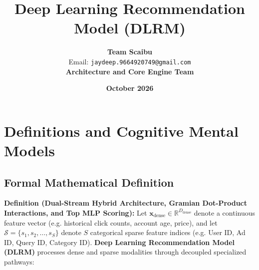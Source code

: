 \documentclass[11pt,a4paper]{article}
\title{\textbf{Deep Learning Recommendation Model (DLRM)}}
\author{\textbf{Team Scaibu} \\ \small Email: \texttt{jaydeep.9664920749@gmail.com} \\ \small \textbf{Architecture and Core Engine Team}}
\date{\textbf{October 2026}}
\theoremstyle{definition}
\begin{document}
\maketitle

\section{Definitions and Cognitive Mental Models}

\subsection{Formal Mathematical Definition}
\textbf{Definition (Dual-Stream Hybrid Architecture, Gramian Dot-Product Interactions, and Top MLP Scoring):}
Let $\mathbf{x}_{\text{dense}} \in \mathbb{R}^{D_{\text{dense}}}$ denote a continuous feature vector (e.g. historical click counts, account age, price), and let $\mathcal{S} = \{s_1, s_2, \dots, s_S\}$ denote $S$ categorical sparse feature indices (e.g. User ID, Ad ID, Query ID, Category ID). \textbf{Deep Learning Recommendation Model (DLRM)} processes dense and sparse modalities through decoupled specialized pathways:
\end{document}
